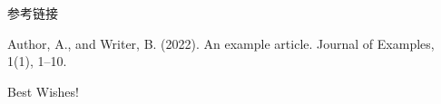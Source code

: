 \documentclass{beamer}
\begin{document}
\begin{frame}{参考链接} %
    \begin{thebibliography}{}
    	 Author, A., and Writer, B. (2022). An example article. Journal of Examples, 1(1), 1--10.
    \end{thebibliography}
\end{frame}


\begin{frame}
    \begin{center}
        {\Huge\calligra Best Wishes!}
    \end{center}
\end{frame}
\end{document}
